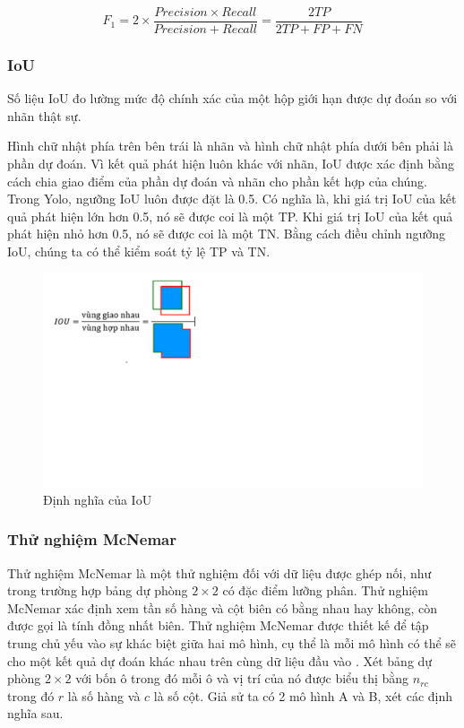 \documentclass[../the.tex]{subfiles}
\begin{document}
\begin{equation}
	F_1 = 2 \times \frac{Precision \times Recall}{Precision + Recall} = \frac{2TP}{2TP + FP + FN}
	\label{eq:f1}
\end{equation}

\subsubsection*{IoU}

{\fontsize{13}{12} \selectfont
	Số liệu IoU đo lường mức độ chính xác của một hộp giới hạn được dự đoán so với nhãn thật sự.

	Hình chữ nhật phía trên bên trái là nhãn và hình chữ nhật phía dưới bên phải là phần dự đoán. Vì kết quả phát hiện luôn khác với nhãn, IoU được xác định bằng cách chia giao điểm của phần dự đoán và nhãn cho phần kết hợp của chúng. Trong Yolo, ngưỡng IoU luôn được đặt là 0.5. Có nghĩa là, khi giá trị IoU của kết quả phát hiện lớn hơn 0.5, nó sẽ được coi là một TP. Khi giá trị IoU của kết quả phát hiện nhỏ hơn 0.5, nó sẽ được coi là một TN. Bằng cách điều chỉnh ngưỡng IoU, chúng ta có thể kiểm soát tỷ lệ TP và TN.
}

\begin{figure}[ht!]
	\centering
	\includegraphics[width=1\textwidth]{images/IoU.PNG}
	\caption{Định nghĩa của IoU}
	\label{fig:IoU}
\end{figure}

\subsubsection*{Thử nghiệm McNemar}

Thử nghiệm McNemar \cite{McNemar1947} là một thử nghiệm đối với dữ liệu được ghép nối, như trong trường hợp bảng dự phòng $2 \times 2$ có đặc điểm lưỡng phân. Thử nghiệm McNemar xác định xem tần số hàng và cột biên có bằng nhau hay không, còn được gọi là tính đồng nhất biên. Thử nghiệm McNemar được thiết kế để tập trung chủ yếu vào sự khác biệt giữa hai mô hình, cụ thể là mỗi mô hình có thể sẽ cho một kết quả dự đoán khác nhau trên cùng dữ liệu đầu vào . Xét bảng dự phòng $2 \times 2$ với bốn ô trong đó mỗi ô và vị trí của nó được biểu thị bằng $n_{rc}$ trong đó $r$ là số hàng và $c$ là số cột. Giả sử ta có 2 mô hình A và B, xét các định nghĩa sau.
\end{document}
